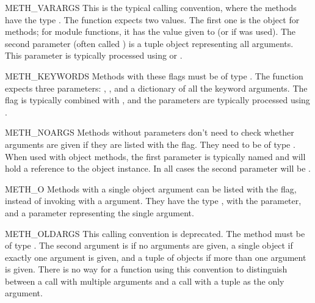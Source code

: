 \begin{datadesc}{METH_VARARGS}
  This is the typical calling convention, where the methods have the
  type . The function expects two
   values.  The first one is the  object for
  methods; for module functions, it has the value given to
   (or \NULL{} if
   was used).  The second parameter
  (often called ) is a tuple object representing all
  arguments. This parameter is typically processed using
   or .
\end{datadesc}

\begin{datadesc}{METH_KEYWORDS}
  Methods with these flags must be of type
  .  The function expects three
  parameters: , , and a dictionary of all the
  keyword arguments.  The flag is typically combined with
  , and the parameters are typically processed
  using .
\end{datadesc}

\begin{datadesc}{METH_NOARGS}
  Methods without parameters don't need to check whether arguments are
  given if they are listed with the  flag.  They
  need to be of type .  When used with object
  methods, the first parameter is typically named  and will
  hold a reference to the object instance.  In all cases the second
  parameter will be \NULL.
\end{datadesc}

\begin{datadesc}{METH_O}
  Methods with a single object argument can be listed with the
   flag, instead of invoking
   with a  argument. They have
  the type , with the  parameter, and a
   parameter representing the single argument.
\end{datadesc}

\begin{datadesc}{METH_OLDARGS}
  This calling convention is deprecated.  The method must be of type
  .  The second argument is \NULL{} if no arguments
  are given, a single object if exactly one argument is given, and a
  tuple of objects if more than one argument is given.  There is no
  way for a function using this convention to distinguish between a
  call with multiple arguments and a call with a tuple as the only
  argument.
\end{datadesc}

